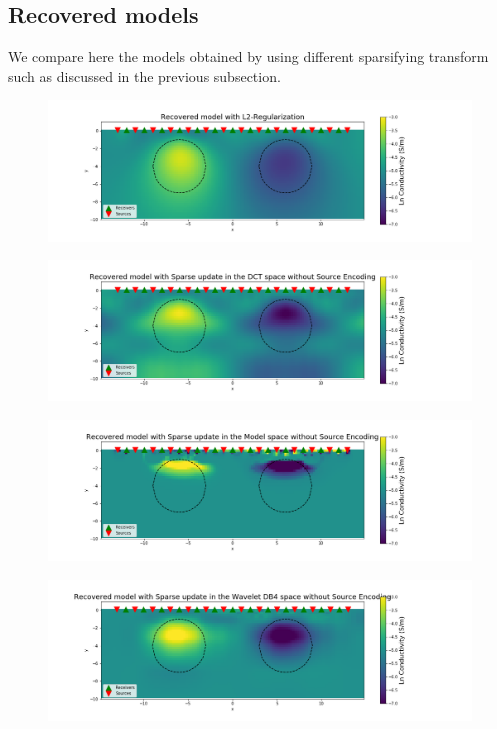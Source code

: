 \documentclass[twoside]{article}
\begin{document}
\newpage

\subsection{Recovered models}

We compare here the models obtained by using different sparsifying transform such as discussed in the previous subsection.

\begin{figure}[!ht]
\centering
\begin{minipage}{0.99\textwidth}
  \centering
    \includegraphics[width=.75\linewidth]{figures/recoveredModel.png}
  \label{recoveredModel_L2}
\end{minipage}
\begin{minipage}{.99\textwidth}
  \centering
  \includegraphics[width=.75\linewidth]{figures/recoveredModel_SparseDCT.png}
  \label{recoveredModel_DCT}
\end{minipage}
\begin{minipage}{.99\textwidth}
  \centering
  \includegraphics[width=.75\linewidth]{figures/recoveredModel_SparseId.png}
  \label{recoveredModel_Id}
\end{minipage}
\begin{minipage}{.99\textwidth}
  \centering
  \includegraphics[width=.75\linewidth]{figures/recoveredModel_SparseWVT_DB4_withoutW.png}
  \label{recoveredModel_WVT4}
\end{minipage}
\end{figure}
\end{document}
